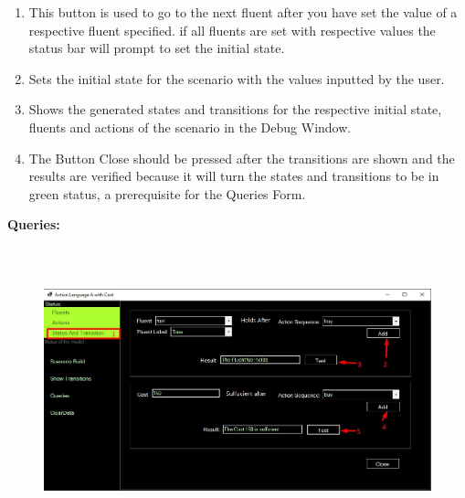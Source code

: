 \documentclass[12pt]{article}
\begin{document}
\begin{enumerate}
	\item This button is used to go to the next fluent after you have set the value of a respective fluent specified. if all fluents are set with respective values the status bar will prompt to set the initial state.\par

	\item Sets the initial state for the scenario with the values inputted by the user.\par

	\item Shows the generated states and transitions for the respective initial state, fluents and actions of the scenario in the Debug Window.\par

	\item The Button Close should be pressed after the transitions are shown and the results are verified because it will turn the states and transitions to be in green status, a prerequisite for the Queries Form.
\end{enumerate}\par


\vspace{\baselineskip}

\vspace{\baselineskip}
\textbf{Queries:}\par


\vspace{\baselineskip}



\begin{figure}[H]
	\begin{Center}
		\includegraphics[width=6.26in,height=3.26in]{./media/image8.jpeg}
	\end{Center}
\end{figure}
\end{document}
